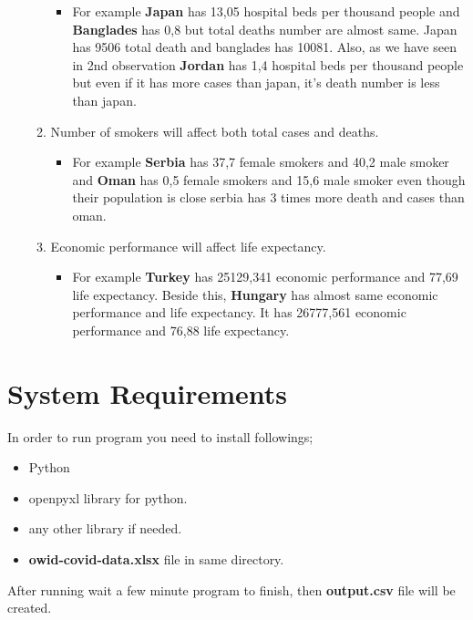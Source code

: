 \documentclass[a4 paper]{article}
\numberwithin{equation}{section}
\newcommand{\0}{\mathbf{0}}
\begin{document}
\begin{itemize}
\begin{enumerate}
  	\begin{itemize}
    \item For example \textbf{Japan} has 13,05 hospital beds per thousand people and \textbf{Banglades} has 0,8 but total deaths number are almost same. Japan has 9506 total death and banglades has 10081. Also, as we have seen in 2nd observation \textbf{Jordan} has 1,4 hospital beds per thousand people but even if it has more cases than japan, it's death number is less than japan.
  \end{itemize}
  \item Number of smokers will affect both total cases and deaths.
  	\begin{itemize}
    \item For example \textbf{Serbia} has 37,7 female smokers and 40,2 male smoker and \textbf{Oman} has 0,5 female smokers and 15,6 male smoker even though their population is close serbia has 3 times more death and cases than oman.
  \end{itemize}
  \item Economic performance will affect life expectancy.
  	\begin{itemize}
    \item For example \textbf{Turkey} has 25129,341 economic performance and 77,69 life expectancy. Beside this, \textbf{Hungary} has almost same economic performance and life expectancy. It has 26777,561 economic performance and 76,88 life expectancy.
  \end{itemize}
\end{enumerate}
\end{itemize}
\section*{System Requirements}
In order to run program you need to install followings;
\begin{itemize}
	\item Python
	\item openpyxl library for python.
	\item any other library if needed.
	\item \textbf{owid-covid-data.xlsx} file in same directory.
\end{itemize} 
After running wait a few minute program to finish, then \textbf{output.csv} file will be created.
\end{document}
